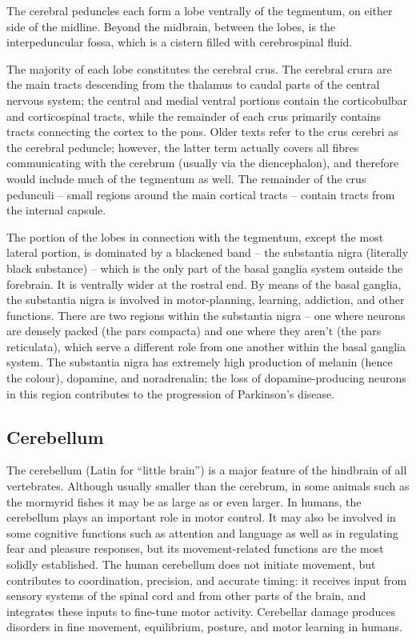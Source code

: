 \documentclass[]{book}
\begin{document}
The cerebral peduncles each form a lobe ventrally of the tegmentum, on either side of the midline. Beyond the midbrain, between the lobes, is the interpeduncular fossa, which is a cistern filled with cerebrospinal fluid.

The majority of each lobe constitutes the cerebral crus. The cerebral crura are the main tracts descending from the thalamus to caudal parts of the central nervous system; the central and medial ventral portions contain the corticobulbar and corticospinal tracts, while the remainder of each crus primarily contains tracts connecting the cortex to the pons. Older texts refer to the crus cerebri as the cerebral peduncle; however, the latter term actually covers all fibres communicating with the cerebrum (usually via the diencephalon), and therefore would include much of the tegmentum as well. The remainder of the crus pedunculi -- small regions around the main cortical tracts -- contain tracts from the internal capsule.

The portion of the lobes in connection with the tegmentum, except the most lateral portion, is dominated by a blackened band -- the substantia nigra (literally black substance) -- which is the only part of the basal ganglia system outside the forebrain. It is ventrally wider at the rostral end. By means of the basal ganglia, the substantia nigra is involved in motor-planning, learning, addiction, and other functions. There are two regions within the substantia nigra -- one where neurons are densely packed (the pars compacta) and one where they aren't (the pars reticulata), which serve a different role from one another within the basal ganglia system. The substantia nigra has extremely high production of melanin (hence the colour), dopamine, and noradrenalin; the loss of dopamine-producing neurons in this region contributes to the progression of Parkinson's disease.

\hypertarget{cerebellum}{%
\subsection{Cerebellum}\label{cerebellum}}

The cerebellum (Latin for ``little brain'') is a major feature of the hindbrain of all vertebrates. Although usually smaller than the cerebrum, in some animals such as the mormyrid fishes it may be as large as or even larger. In humans, the cerebellum plays an important role in motor control. It may also be involved in some cognitive functions such as attention and language as well as in regulating fear and pleasure responses, but its movement-related functions are the most solidly established. The human cerebellum does not initiate movement, but contributes to coordination, precision, and accurate timing: it receives input from sensory systems of the spinal cord and from other parts of the brain, and integrates these inputs to fine-tune motor activity. Cerebellar damage produces disorders in fine movement, equilibrium, posture, and motor learning in humans.
\end{document}
